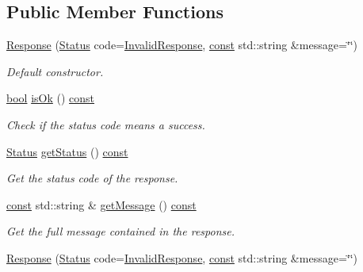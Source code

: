 \subsection*{Public Member Functions}
\begin{DoxyCompactItemize}
\item 
\hyperlink{classsf_1_1_ftp_1_1_response_af300fffd4862774102f978eb22f85d9b}{Response} (\hyperlink{classsf_1_1_ftp_1_1_response_af81738f06b6f571761696291276acb3b}{Status} code=\hyperlink{classsf_1_1_ftp_1_1_response_af81738f06b6f571761696291276acb3ba2832369b24738d47a832361b09fef964}{Invalid\-Response}, \hyperlink{term__entry_8h_a57bd63ce7f9a353488880e3de6692d5a}{const} std\-::string \&message=\char`\"{}\char`\"{})
\begin{DoxyCompactList}\small\item\em Default constructor. \end{DoxyCompactList}\item 
\hyperlink{term__entry_8h_a002004ba5d663f149f6c38064926abac}{bool} \hyperlink{classsf_1_1_ftp_1_1_response_a4dadbe0fe0a3ef2d571a017e1645e675}{is\-Ok} () \hyperlink{term__entry_8h_a57bd63ce7f9a353488880e3de6692d5a}{const} 
\begin{DoxyCompactList}\small\item\em Check if the status code means a success. \end{DoxyCompactList}\item 
\hyperlink{classsf_1_1_ftp_1_1_response_af81738f06b6f571761696291276acb3b}{Status} \hyperlink{classsf_1_1_ftp_1_1_response_ac7f937b3883d1c4fbc75c003a1786aaa}{get\-Status} () \hyperlink{term__entry_8h_a57bd63ce7f9a353488880e3de6692d5a}{const} 
\begin{DoxyCompactList}\small\item\em Get the status code of the response. \end{DoxyCompactList}\item 
\hyperlink{term__entry_8h_a57bd63ce7f9a353488880e3de6692d5a}{const} std\-::string \& \hyperlink{classsf_1_1_ftp_1_1_response_a0015675c528a4a84a671484b9e5499d6}{get\-Message} () \hyperlink{term__entry_8h_a57bd63ce7f9a353488880e3de6692d5a}{const} 
\begin{DoxyCompactList}\small\item\em Get the full message contained in the response. \end{DoxyCompactList}\item 
\hyperlink{classsf_1_1_ftp_1_1_response_af300fffd4862774102f978eb22f85d9b}{Response} (\hyperlink{classsf_1_1_ftp_1_1_response_af81738f06b6f571761696291276acb3b}{Status} code=\hyperlink{classsf_1_1_ftp_1_1_response_af81738f06b6f571761696291276acb3ba2832369b24738d47a832361b09fef964}{Invalid\-Response}, \hyperlink{term__entry_8h_a57bd63ce7f9a353488880e3de6692d5a}{const} std\-::string \&message=\char`\"{}\char`\"{})

\end{DoxyCompactItemize}
